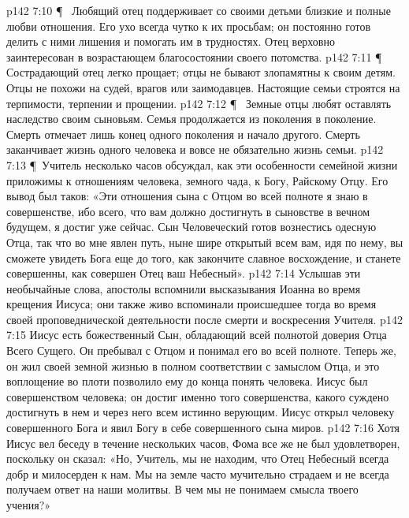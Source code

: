 \vs p142 7:10 \P\ \bibnobreakspace {} Любящий отец поддерживает со своими детьми близкие и полные любви отношения. Его ухо всегда чутко к их просьбам; он постоянно готов делить с ними лишения и помогать им в трудностях. Отец верховно заинтересован в возрастающем благосостоянии своего потомства.
\vs p142 7:11 \P\ \bibnobreakspace {} Сострадающий отец легко прощает; отцы не бывают злопамятны к своим детям. Отцы не похожи на судей, врагов или заимодавцев. Настоящие семьи строятся на терпимости, терпении и прощении.
\vs p142 7:12 \P\ \bibnobreakspace {} Земные отцы любят оставлять наследство своим сыновьям. Семья продолжается из поколения в поколение. Смерть отмечает лишь конец одного поколения и начало другого. Смерть заканчивает жизнь одного человека и вовсе не обязательно жизнь семьи.
\vs p142 7:13 \P\ Учитель несколько часов обсуждал, как эти особенности семейной жизни приложимы к отношениям человека, земного чада, к Богу, Райскому Отцу. Его вывод был таков: «Эти отношения сына с Отцом во всей полноте я знаю в совершенстве, ибо всего, что вам должно достигнуть в сыновстве в вечном будущем, я достиг уже сейчас. Сын Человеческий готов вознестись одесную Отца, так что во мне явлен путь, ныне шире открытый всем вам, идя по нему, вы сможете увидеть Бога еще до того, как закончите славное восхождение, и станете совершенны, как совершен Отец ваш Небесный».
\vs p142 7:14 Услышав эти необычайные слова, апостолы вспомнили высказывания Иоанна во время крещения Иисуса; они также живо вспоминали происшедшее тогда во время своей проповеднической деятельности после смерти и воскресения Учителя.
\vs p142 7:15 Иисус есть божественный Сын, обладающий всей полнотой доверия Отца Всего Сущего. Он пребывал с Отцом и понимал его во всей полноте. Теперь же, он жил своей земной жизнью в полном соответствии с замыслом Отца, и это воплощение во плоти позволило ему до конца понять человека. Иисус был совершенством человека; он достиг именно того совершенства, какого суждено достигнуть в нем и через него всем истинно верующим. Иисус открыл человеку совершенного Бога и явил Богу в себе совершенного сына миров.
\vs p142 7:16 Хотя Иисус вел беседу в течение нескольких часов, Фома все же не был удовлетворен, поскольку он сказал: «Но, Учитель, мы не находим, что Отец Небесный всегда добр и милосерден к нам. Мы на земле часто мучительно страдаем и не всегда получаем ответ на наши молитвы. В чем мы не понимаем смысла твоего учения?»
